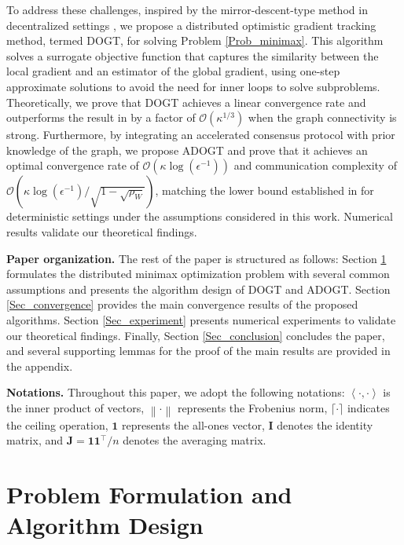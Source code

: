 \documentclass[letterpaper, 10 pt, conference]{ieeeconf}
\begin{document}
To address these challenges, inspired by the mirror-descent-type method in decentralized settings \cite{sonata, beznosikov2021distributed}, we propose a distributed optimistic gradient tracking method, termed DOGT, for solving Problem \eqref{Prob_minimax}. This algorithm solves a surrogate objective function that captures the similarity between the local gradient and an estimator of the global gradient, using one-step approximate solutions to avoid the need for inner loops to solve subproblems. Theoretically, we prove that DOGT achieves a linear convergence rate and outperforms the result in \cite{mukherjee2020decentralized} by a factor of $\mathcal{O} \left( \kappa ^{1/3} \right) $ when the graph connectivity is strong. Furthermore, by integrating an accelerated consensus protocol with prior knowledge of the graph, we propose ADOGT and prove that it achieves an optimal convergence rate of $\mathcal{O} \left( \kappa \log \left( \epsilon ^{-1} \right) \right)$ and communication complexity of $\mathcal{O} \left( \kappa \log \left( \epsilon ^{-1} \right) /\sqrt{1-\sqrt{\rho _W}} \right)$, matching the lower bound established in \cite{beznosikov2020distributed} for deterministic settings under the assumptions considered in this work. Numerical results validate our theoretical findings.

\textbf{Paper organization.} The rest of the paper is structured as follows: Section \ref{Sec_prob_algorithm} formulates the distributed minimax optimization problem with several common assumptions and presents the algorithm design of DOGT and ADOGT. Section \ref{Sec_convergence} provides the main convergence results of the proposed algorithms. Section \ref{Sec_experiment} presents numerical experiments to validate our theoretical findings. Finally, Section \ref{Sec_conclusion} concludes the paper, and several supporting lemmas for the proof of the main results are provided in the appendix.

\textbf{Notations.} Throughout this paper, we adopt the following notations: $\left< \cdot ,\cdot \right> $ is the inner product of vectors, $\left\| \cdot \right\|$ represents the Frobenius norm, $\lceil \cdot \rceil$ indicates the ceiling operation, $\mathbf{1}$ represents the all-ones vector, $\mathbf{I}$ denotes the identity matrix, and $\mathbf{J}=\mathbf{1}\mathbf{1}^{\top}/n$ denotes the averaging matrix. 




\section{Problem Formulation and Algorithm Design}\label{Sec_prob_algorithm}
\end{document}

